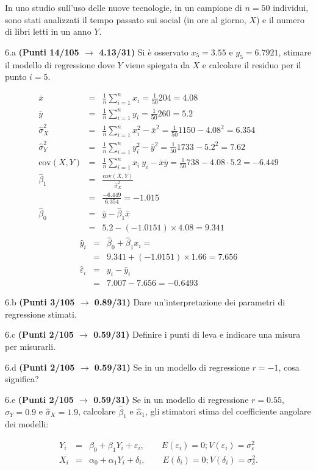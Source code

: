 \documentclass[
  11pt,
]{book}
\theoremstyle{mytheoremstyle}
\theoremstyle{mydefstyle}
\newenvironment{sol}
  {
  \begin{tcolorbox}[enhanced,breakable,arc=0.1mm,boxrule=1pt,colback=white,colframe=iblue,
  title=\bf \fontfamily{lmss}\selectfont \hspace{.5 cm} Soluzione,drop fuzzy shadow]

}{
\end{tcolorbox}
  }
\begin{document}
In uno studio sull'uso delle nuove tecnologie, in un campione di \(n=50\) individui, sono stati analizzati il tempo passato sui social (in ore al giorno, \(X\)) e il numero di libri letti in un anno \(Y\).

6.a \textbf{(Punti 14/105 \(\rightarrow\) 4.13/31)} Si è osservato \(x_5=3.55\) e \(y_5=6.7921\), stimare il modello di regressione dove \(Y\) viene spiegata da \(X\) e calcolare il residuo per il punto \(i=5\).

\begin{sol}
\begin{eqnarray*}
           \bar x &=&\frac 1 n\sum_{i=1}^n x_i = \frac {1}{ 50 }  204 =  4.08 \\
           \bar y &=&\frac 1 n\sum_{i=1}^n y_i = \frac {1}{ 50 }  260 =  5.2 \\
           \hat\sigma_X^2&=&\frac 1 n\sum_{i=1}^n x_i^2-\bar x^2=\frac {1}{ 50 }  1150  - 4.08 ^2= 6.354 \\
           \hat\sigma_Y^2&=&\frac 1 n\sum_{i=1}^n y_i^2-\bar y^2=\frac {1}{ 50 }  1733  - 5.2 ^2= 7.62 \\
           \text{cov}(X,Y)&=&\frac 1 n\sum_{i=1}^n x_i~y_i-\bar x\bar y=\frac {1}{ 50 }  738 - 4.08 \cdot 5.2 = -6.449 \\
           \hat\beta_1 &=& \frac{\text{cov}(X,Y)}{\hat\sigma_X^2} \\
                    &=& \frac{ -6.449 }{ 6.354 }  =  -1.015 \\
           \hat\beta_0 &=& \bar y - \hat\beta_1 \bar x\\
                    &=&  5.2 - (-1.0151) \times  4.08 = 9.341 
         \end{eqnarray*}\begin{eqnarray*}
\hat y_i &=&\hat\beta_0+\hat\beta_1 x_i=\\ 
&=& 9.341 + (-1.0151) \times 1.66 = 7.656 \\ 
\hat \varepsilon_i &=& y_i-\hat y_i\\ 
&=& 7.007 - 7.656 = -0.6493  
\end{eqnarray*}

\end{sol}

6.b \textbf{(Punti 3/105 \(\rightarrow\) 0.89/31)} Dare un'interpretazione dei parametri di regressione stimati.

6.c \textbf{(Punti 2/105 \(\rightarrow\) 0.59/31)} Definire i punti di leva e indicare una misura per misurarli.

6.d \textbf{(Punti 2/105 \(\rightarrow\) 0.59/31)} Se in un modello di regressione \(r=-1\), cosa significa?

6.e \textbf{(Punti 2/105 \(\rightarrow\) 0.59/31)} Se in un modello di regressione \(r=0.55\), \(\hat\sigma_Y=0.9\) e \(\hat\sigma_X=1.9\), calcolare \(\hat\beta_1\) e
\(\hat\alpha_1\), gli stimatori stima del coefficiente angolare dei modelli:

\begin{eqnarray*}
Y_i &=& \beta_0+\beta_1 Y_i + \varepsilon_i, \qquad E(\varepsilon_i)=0; V(\varepsilon_i)=\sigma_\varepsilon^2\\
X_i &=& \alpha_0+\alpha_1 Y_i + \delta_i, \qquad E(\delta_i)=0; V(\delta_i)=\sigma_\delta^2.
\end{eqnarray*}
\end{document}
